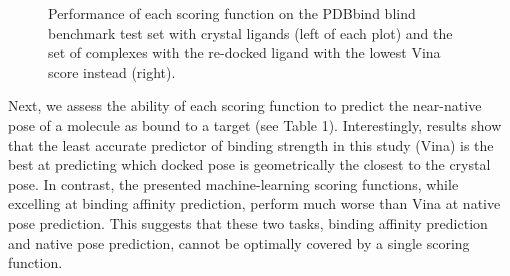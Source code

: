 \begin{figure}
\centering
{}
\caption{Performance of each scoring function on the PDBbind blind benchmark test set with crystal ligands (left of each plot) and the set of complexes with the re-docked ligand with the lowest Vina score instead (right).}
\label{rfscore4:set-2-pdbbind-2012-trn-2}
\end{figure}

Next, we assess the ability of each scoring function to predict the near-native pose of a molecule as bound to a target (see Table 1). Interestingly, results show that the least accurate predictor of binding strength in this study (Vina) is the best at predicting which docked pose is geometrically the closest to the crystal pose. In contrast, the presented machine-learning scoring functions, while excelling at binding affinity prediction, perform much worse than Vina at native pose prediction. This suggests that these two tasks, binding affinity prediction and native pose prediction, cannot be optimally covered by a single scoring function.

